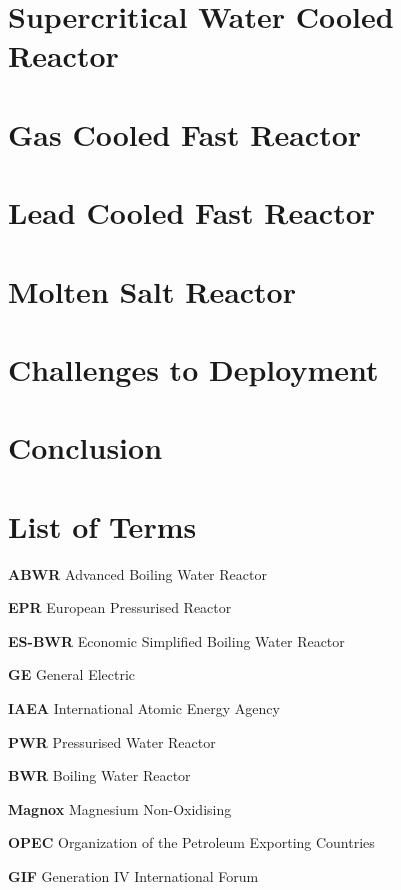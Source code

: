 \documentclass[journal]{IEEEtran}
\begin{document}
\section{Supercritical Water Cooled Reactor}

\section{Gas Cooled Fast Reactor}

\section{Lead Cooled Fast Reactor}

\section{Molten Salt Reactor}

\section{Challenges to Deployment}

\section{Conclusion}





\appendices
\section{List of Terms}
\footnotesize
\scriptsize
\textbf{ABWR}  Advanced Boiling Water Reactor   

\textbf{EPR}  European Pressurised Reactor  

\textbf{ES-BWR}  Economic Simplified Boiling Water Reactor  

\textbf{GE}  General Electric  

\textbf{IAEA}  International Atomic Energy Agency  

\textbf{PWR}  Pressurised Water Reactor  

\textbf{BWR}  Boiling Water Reactor  

\textbf{Magnox}  Magnesium Non-Oxidising  

\textbf{OPEC}  Organization of the Petroleum Exporting Countries  

\textbf{GIF}  Generation IV International Forum  
\end{document}
